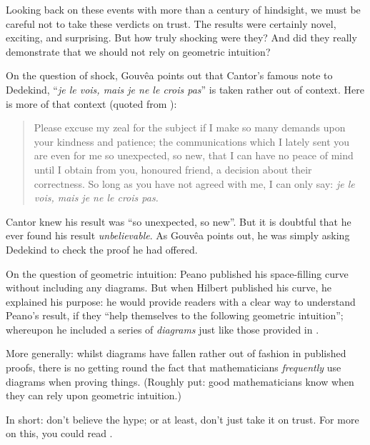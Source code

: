 \documentclass[../../../include/open-logic-section]{subfiles}
\begin{document}

Looking back on these events with more than a century of hindsight, we
must be careful not to take these verdicts on trust. The results were
certainly novel, exciting, and surprising. But how truly shocking were
they? And did they really demonstrate that we should not rely on
geometric intuition?

On the question of shock, Gouv\^{e}a points out that Cantor's
famous note to Dedekind, ``\emph{je le vois, mais je ne le crois
pas}'' is taken rather out of context. Here is more of that context
(quoted from \cite{Gouvea2011}):
\begin{quote}
Please excuse my zeal for the subject if I make so many demands upon
your kindness and patience; the communications which I lately sent you
are even for me so unexpected, so new, that I can have no peace of
mind until I obtain from you, honoured friend, a decision about their
correctness. So long as you have not agreed with me, I can only say:
\emph{je le vois, mais je ne le crois pas.} 
\end{quote}
Cantor knew his result was ``so unexpected, so new''. But it is
doubtful that he ever found his result \emph{unbelievable}. As
Gouv\^{e}a points out, he was simply asking Dedekind to
check the proof he had offered. 

On the question of geometric intuition: Peano published his
space-filling curve without including any diagrams. But when Hilbert
published his curve, he explained his purpose: he would provide
readers with a clear way to understand Peano's result, if they ``help
themselves to the following geometric intuition''; whereupon he
included a series of \emph{diagrams} just like those provided in
. 

More generally: whilst diagrams have fallen rather out of fashion in
published proofs, there is no getting round the fact that
mathematicians \emph{frequently} use diagrams when proving things.
(Roughly put: good mathematicians know when they can rely upon
geometric intuition.)

In short: don't believe the hype; or at least, don't just take it on
trust. For more on this, you could read \cite{Giaquinto2007}.
\end{document}
